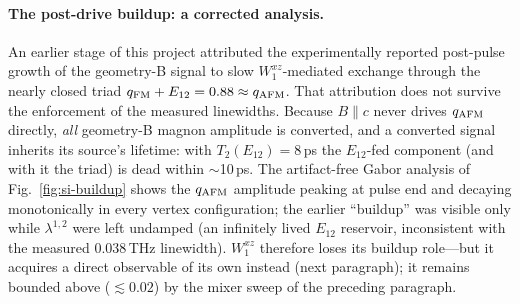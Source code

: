 \documentclass[11pt]{article}
\newcommand{\qafm}{q_{\rm AFM}}
\newcommand{\qfm}{q_{\rm FM}}
\begin{document}
\paragraph{The post-drive buildup: a corrected analysis.}
An earlier stage of this project attributed the experimentally reported
post-pulse growth of the geometry-B signal to slow $W^{xz}_1$-mediated
exchange through the nearly closed triad
$\qfm+E_{12}=0.88\approx\qafm$.  That attribution does not survive the
enforcement of the measured linewidths.  Because $B\!\parallel\!c$ never
drives $\qafm$ directly, \emph{all} geometry-B magnon amplitude is
converted, and a converted signal inherits its source's lifetime: with
$T_2(E_{12})=8$\,ps the $E_{12}$-fed component (and with it the triad)
is dead within $\sim$10\,ps.  The artifact-free Gabor analysis of
Fig.~\ref{fig:si-buildup} shows the $\qafm$ amplitude peaking at pulse
end and decaying monotonically in every vertex configuration; the
earlier ``buildup'' was visible only while $\lambda^{1,2}$ were left
undamped (an infinitely lived $E_{12}$ reservoir, inconsistent with the
measured $0.038$\,THz linewidth).  $W^{xz}_1$ therefore loses its
buildup role---but it acquires a direct observable of its own instead
(next paragraph); it remains bounded above ($\lesssim0.02$) by the
mixer sweep of the preceding paragraph.
\end{document}
